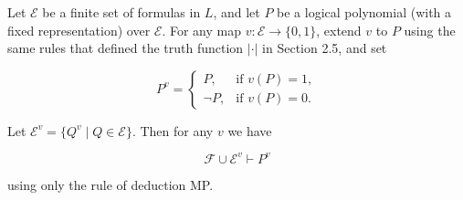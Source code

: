 Let $\mathcal{E}$ be a finite set of formulas in $L$, and let $P$ be a logical polynomial (with a fixed representation) over $\mathcal{E}$. For any map $v : \mathcal{E} \to \{0,1\}$, extend $v$ to $P$ using the same rules that defined the truth function $|\cdot|$ in Section 2.5, and set

$$P^v = \begin{cases} P, & \text{if } v(P) = 1, \\ \neg P, & \text{if } v(P) = 0. \end{cases}$$

Let $\mathcal{E}^v = \{Q^v \mid Q \in \mathcal{E}\}$. Then for any $v$ we have

$$\mathcal{F} \cup \mathcal{E}^v \vdash P^v$$

using only the rule of deduction MP.
